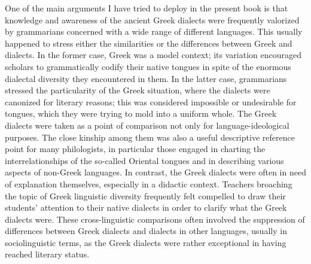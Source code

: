 One of the main arguments I have tried to deploy in the present book is that knowledge and awareness of the ancient Greek dialects were frequently valorized by grammarians concerned with a wide range of different languages. This usually happened to stress either the similarities or the differences between Greek and  dialects. In the former case, Greek was a model context; its variation encouraged scholars to grammatically codify their native tongues in spite of the enormous dialectal diversity they encountered in them. In the latter case,  grammarians stressed the particularity of the Greek situation, where the dialects were canonized for literary reasons; this was considered impossible or undesirable for  tongues, which they were trying to mold into a uniform whole. The Greek dialects were taken as a point of comparison not only for language-ideological purposes. The close kinship among them was also a useful descriptive reference point for many philologists, in particular those engaged in charting the interrelationships of the so-called Oriental tongues and in describing various aspects of non-Greek languages. In contrast, the Greek dialects were often in need of explanation themselves, especially in a didactic context. Teachers broaching the topic of Greek linguistic diversity frequently felt compelled to draw their students’ attention to their native dialects in order to clarify what the Greek dialects were. These cross-linguistic comparisons often involved the suppression of differences between Greek dialects and dialects in other languages, usually in sociolinguistic terms, as the Greek dialects were rather exceptional in having reached literary status.

